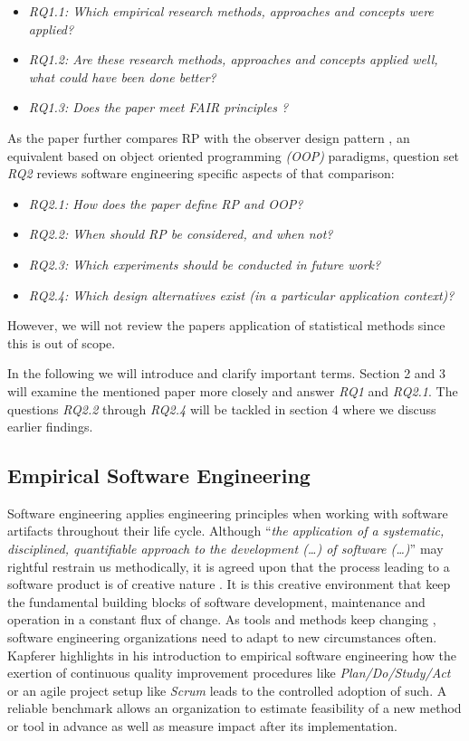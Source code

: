 \documentclass[12pt,a4paper]{article}
\begin{document}
\begin{itemize}
	\item \emph{RQ1.1: Which empirical research methods, approaches and concepts were applied?}
	\item \emph{RQ1.2: Are these research methods, approaches and concepts applied well, what could have been done better?}
	\item \emph{RQ1.3: Does the paper meet FAIR principles \cite{2019arXiv190805986H} \cite{wilkinson:2016}?}
\end{itemize}

As the paper further compares RP with the observer design pattern \cite{gamma1995design}, an equivalent based on object oriented programming \emph{(OOP)} paradigms, question set \emph{RQ2} reviews software engineering specific aspects of that comparison:

\begin{itemize}
	\item \emph{RQ2.1: How does the paper define RP and OOP?}
	\item \emph{RQ2.2: When should RP be considered, and when not?}
	\item \emph{RQ2.3: Which experiments should be conducted in future work?}
	\item \emph{RQ2.4: Which design alternatives exist (in a particular application context)?}
\end{itemize}

However, we will not review the papers application of statistical methods since this is out of scope.

In the following we will introduce and clarify important terms. Section 2 and 3 will examine the mentioned paper more closely and answer \emph{RQ1} and \emph{RQ2.1}. The questions \emph{RQ2.2} through \emph{RQ2.4} will be tackled in section 4 where we discuss earlier findings.

\subsection{Empirical Software Engineering}
Software engineering applies engineering principles when working with software artifacts \cite{159342} throughout their life cycle. Although ``\emph{the application of a systematic, disciplined, quantifiable approach to the development (\dots) of software (\dots)}'' \cite{159342} may rightful restrain us methodically, it is agreed upon that the process leading to a software product is of creative nature \cite{8051350}. It is this creative environment that keep the fundamental building blocks of software development, maintenance and operation in a constant flux of change. As tools and methods keep changing \cite{kapferer:2019:empirical}, software engineering organizations need to adapt to new circumstances often. Kapferer \cite{kapferer:2019:empirical} highlights in his introduction to empirical software engineering how the exertion of continuous quality improvement procedures like \emph{Plan/Do/Study/Act} \cite{deming} or an agile project setup like \emph{Scrum} leads to the controlled adoption of such. A reliable benchmark allows an organization to estimate feasibility of a new method or tool in advance as well as measure impact after its implementation.
\end{document}
